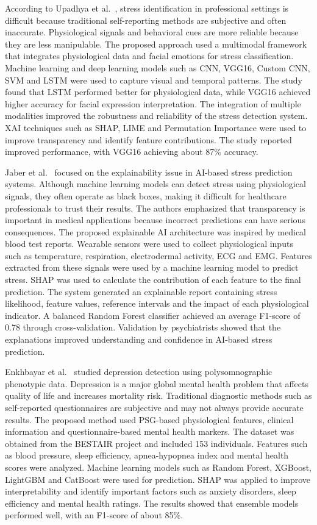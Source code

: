 \documentclass[12pt,a4paper]{report}
\begin{document}
According to Upadhya et al.~\cite{b10}, stress identification in professional settings is difficult because traditional self-reporting methods are subjective and often inaccurate. Physiological signals and behavioral cues are more reliable because they are less manipulable. The proposed approach used a multimodal framework that integrates physiological data and facial emotions for stress classification. Machine learning and deep learning models such as CNN, VGG16, Custom CNN, SVM and LSTM were used to capture visual and temporal patterns. The study found that LSTM performed better for physiological data, while VGG16 achieved higher accuracy for facial expression interpretation. The integration of multiple modalities improved the robustness and reliability of the stress detection system. XAI techniques such as SHAP, LIME and Permutation Importance were used to improve transparency and identify feature contributions. The study reported improved performance, with VGG16 achieving about 87\% accuracy.

Jaber et al.~\cite{b11} focused on the explainability issue in AI-based stress prediction systems. Although machine learning models can detect stress using physiological signals, they often operate as black boxes, making it difficult for healthcare professionals to trust their results. The authors emphasized that transparency is important in medical applications because incorrect predictions can have serious consequences. The proposed explainable AI architecture was inspired by medical blood test reports. Wearable sensors were used to collect physiological inputs such as temperature, respiration, electrodermal activity, ECG and EMG. Features extracted from these signals were used by a machine learning model to predict stress. SHAP was used to calculate the contribution of each feature to the final prediction. The system generated an explainable report containing stress likelihood, feature values, reference intervals and the impact of each physiological indicator. A balanced Random Forest classifier achieved an average F1-score of 0.78 through cross-validation. Validation by psychiatrists showed that the explanations improved understanding and confidence in AI-based stress prediction.

Enkhbayar et al.~\cite{b12} studied depression detection using polysomnographic phenotypic data. Depression is a major global mental health problem that affects quality of life and increases mortality risk. Traditional diagnostic methods such as self-reported questionnaires are subjective and may not always provide accurate results. The proposed method used PSG-based physiological features, clinical information and questionnaire-based mental health markers. The dataset was obtained from the BESTAIR project and included 153 individuals. Features such as blood pressure, sleep efficiency, apnea-hypopnea index and mental health scores were analyzed. Machine learning models such as Random Forest, XGBoost, LightGBM and CatBoost were used for prediction. SHAP was applied to improve interpretability and identify important factors such as anxiety disorders, sleep efficiency and mental health ratings. The results showed that ensemble models performed well, with an F1-score of about 85\%.
\end{document}
